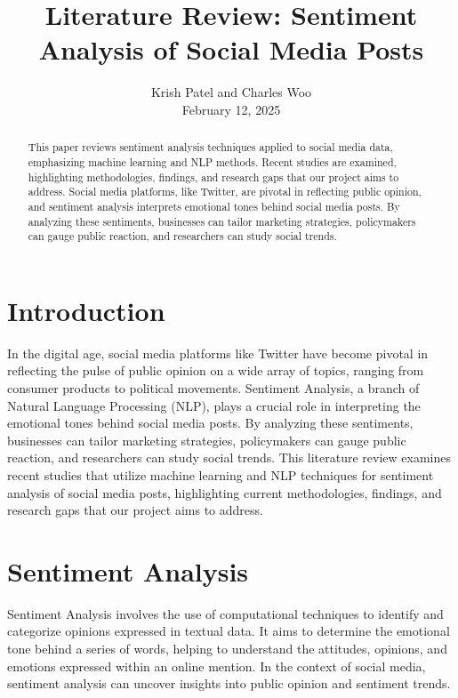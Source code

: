 \documentclass{IEEEtran}
\begin{document}
\title{Literature Review: Sentiment Analysis of Social Media Posts}
\author{Krish Patel and Charles Woo \\ February 12, 2025}

\maketitle

\begin{abstract}
This paper reviews sentiment analysis techniques applied to social media data, emphasizing machine learning and NLP methods. Recent studies are examined, highlighting methodologies, findings, and research gaps that our project aims to address. Social media platforms, like Twitter, are pivotal in reflecting public opinion, and sentiment analysis interprets emotional tones behind social media posts. By analyzing these sentiments, businesses can tailor marketing strategies, policymakers can gauge public reaction, and researchers can study social trends.
\end{abstract}

\section{Introduction}
In the digital age, social media platforms like Twitter have become pivotal in reflecting the pulse of public opinion on a wide array of topics, ranging from consumer products to political movements. Sentiment Analysis, a branch of Natural Language Processing (NLP), plays a crucial role in interpreting the emotional tones behind social media posts. By analyzing these sentiments, businesses can tailor marketing strategies, policymakers can gauge public reaction, and researchers can study social trends. This literature review examines recent studies that utilize machine learning and NLP techniques for sentiment analysis of social media posts, highlighting current methodologies, findings, and research gaps that our project aims to address.

\section{Sentiment Analysis}
Sentiment Analysis involves the use of computational techniques to identify and categorize opinions expressed in textual data. It aims to determine the emotional tone behind a series of words, helping to understand the attitudes, opinions, and emotions expressed within an online mention. In the context of social media, sentiment analysis can uncover insights into public opinion and sentiment trends.
\end{document}
